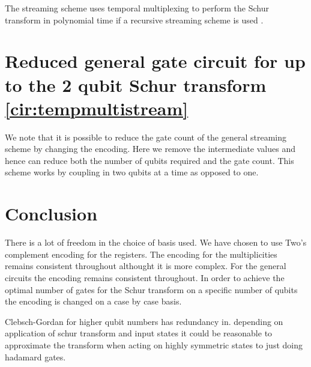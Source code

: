\documentclass[12pt]{article}
\begin{document}
The streaming scheme uses temporal multiplexing to perform the Schur transform in polynomial time if a recursive streaming scheme is used \cite{bacon2007quantum}.


\section{Reduced general gate circuit for up to the 2 qubit Schur transform \autoref{cir:tempmultistream}}

We note that it is possible to reduce the gate count of the general streaming scheme by changing the encoding. Here we remove the intermediate values and hence can reduce both the number of qubits required and the gate count. This scheme works by coupling in two qubits at a time as opposed to one.


\section{Conclusion}

There is a lot of freedom in the choice of basis used. We have chosen to use Two's complement encoding for the registers. The encoding for the multiplicities remains consistent throughout althought it is more complex. For the general circuits the encoding remains consistent throughout. In order to achieve the optimal number of gates for the Schur transform on a specific number of qubits the encoding is changed on a case by case basis. 

Clebsch-Gordan for higher qubit numbers has redundancy in. depending on application of schur transform and input states it could be reasonable to approximate the transform when acting on highly symmetric states to just doing hadamard gates.





\newpage

\begin{landscape}

\end{landscape}

\end{document}
